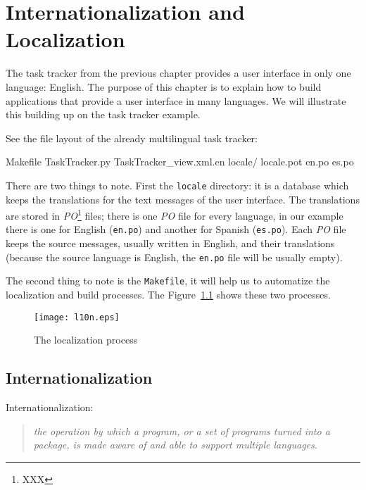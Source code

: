 \chapter{Internationalization and Localization}
\label{Chapter: i18n}

The task tracker from the previous chapter provides a user interface in
only one language: English. The purpose of this chapter is to explain how
to build applications that provide a user interface in many languages.
We will illustrate this building up on the task tracker example.

See the file layout of the already multilingual task tracker:

\begin{code}
    Makefile
    TaskTracker.py
    TaskTracker_view.xml.en
    locale/
      locale.pot
      en.po
      es.po
\end{code}

There are two things to note. First the {\tt locale} directory: it is
a database which keeps the translations for the text messages of the user
interface. The translations are stored in {\em PO}\footnote{XXX} files;
there is one {\em PO} file for every language, in our example there is
one for English ({\tt en.po}) and another for Spanish ({\tt es.po}). Each
{\em PO} file keeps the source messages, usually written in English, and
their translations (because the source language is English, the {\tt en.po}
file will be usually empty).

The second thing to note is the {\tt Makefile}, it will help us to automatize
the localization and build processes. The Figure~\ref{Figure: l10n} shows
these two processes.

\begin{figure}
  \center
  \texttt{[image: l10n.eps]}
  \caption{The localization process}
  \label{Figure: l10n}
\end{figure}


\section{Internationalization}

Internationalization:

\begin{quote}
  \em
  the operation by which a program, or a set
  of programs turned into a package, is made aware of and able to support
  multiple languages.
\end{quote}

